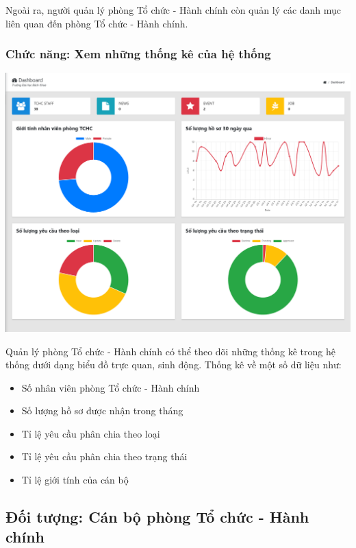 Ngoài ra, người quản lý phòng Tổ chức - Hành chính còn quản lý các danh mục liên quan đến phòng Tổ chức - Hành chính.
\subsubsection{Chức năng: Xem những thống kê của hệ thống}
\begin{center}
  \captionsetup{type=figure}
  \includegraphics[width=15cm]{img/UML/User/dashboard.png}
\end{center}

Quản lý phòng Tổ chức - Hành chính có thể theo dõi những thống kê trong hệ thống dưới dạng biểu đồ trực quan, sinh động. Thống kê về một số dữ liệu như:
\begin{itemize}
    \item Số nhân viên phòng Tổ chức - Hành chính
    \item Số lượng hồ sơ được nhận trong tháng
    \item Tỉ lệ yêu cầu phân chia theo loại
    \item Tỉ lệ yêu cầu phân chia theo trạng thái
    \item Tỉ lệ giới tính của cán bộ
\end{itemize}
\subsection{Đối tượng: Cán bộ phòng Tổ chức - Hành chính}
